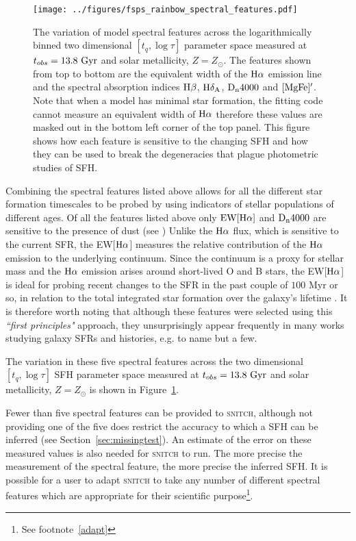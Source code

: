 \documentclass[useAMS,usenatbib]{mn2e}
\def\referee		{\color{refer}}
\begin{document}
\begin{figure}
\centering
\texttt{[image: ../figures/fsps\_rainbow\_spectral\_features.pdf]}
\caption{The variation of model spectral features across the logarithmically binned two dimensional $[t_q, \log \tau]$ parameter space measured at $t_{obs}=13.8~\rm{Gyr}$ and solar metallicity, $Z=Z_{\odot}$. The features shown from top to bottom are the equivalent width of the $\rm{H}\alpha$ emission line and the spectral absorption indices $\rm{H}\beta$, $\rm{H}\delta_A$, $\rm{D}_n4000$ and $[\rm{MgFe}]^{\prime}$. Note that when a model has minimal star formation, the fitting code cannot measure an equivalent width of $\rm{H}\alpha$ therefore these values are masked out in the bottom left corner of the top panel. This figure shows how each feature is sensitive to the changing SFH and how they can be used to break the degeneracies that plague photometric studies of SFH. }
\label{fig:rainbow}
\end{figure}

{\referee Combining the spectral features listed above allows for all the different star formation timescales to be probed by using indicators of stellar populations of different ages. Of all the features listed above only $\rm{EW}[\rm{H}\alpha]$ and $\rm{D}_n4000$ are sensitive to the presence of dust (see \citealt{balogh99})} {\referee Unlike the $\rm{H}\alpha$ flux, which is sensitive to the current SFR, the EW[$\rm{H}\alpha$] measures the relative contribution of the $\rm{H}\alpha$ emission to the underlying continuum. Since the continuum is a proxy for stellar mass and the $\rm{H}\alpha$ emission arises around short-lived O and B stars, the EW[$\rm{H}\alpha$] is ideal for probing recent changes to the SFR in the past couple of $100$ Myr or so, in relation to the total integrated star formation over the galaxy’s lifetime \citep[see also][]{li15, zick18}.} It is therefore worth noting that although these features were selected using this \emph{``first principles"} approach, they unsurprisingly appear frequently in many works studying galaxy SFRs and histories, e.g. \cite{kauffmann03, brinchmann04, goto05b, moustakas06, martin07, huang13, li15, wang18, spindler18, zick18} to name but a few. 

The variation in these five spectral features across the two dimensional $[t_q, \log \tau]$ SFH parameter space measured at $t_{obs}=13.8~\rm{Gyr}$ and solar metallicity, $Z=Z_{\odot}$ is shown in Figure~\ref{fig:rainbow}.


Fewer than five spectral features can be provided to \textsc{snitch}, although not providing one of the five does restrict the accuracy to which a SFH can be inferred (see Section~\ref{sec:missingtest}). An estimate of the error on these measured values is also needed for \textsc{snitch} to run. The more precise the measurement of the spectral feature, the more precise the inferred SFH. It is possible for a user to adapt \textsc{snitch} to take any number of different spectral features which are appropriate for their scientific purpose\footnote{See footnote~\ref{adapt}}.
\end{document}
